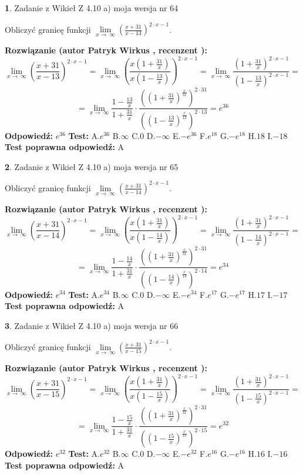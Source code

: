 \documentclass[12pt, a4paper]{article}
\theoremstyle{definition} %
\newtheorem{zad}{}
\newcommand{\zadStart}[1]{\begin{zad}#1\newline}
\newcommand{\zadStop}{\end{zad}}
\newcommand{\rozwStart}[2]{\noindent \textbf{Rozwiązanie (autor #1 , recenzent #2): }\newline}
\newcommand{\rozwStop}{\newline}
\newcommand{\odpStart}{\noindent \textbf{Odpowiedź:}\newline}
\newcommand{\odpStop}{\newline}
\newcommand{\testStart}{\noindent \textbf{Test:}\newline}
\newcommand{\testStop}{\newline}
\newcommand{\kluczStart}{\noindent \textbf{Test poprawna odpowiedź:}\newline}
\newcommand{\kluczStop}{\newline}
\begin{document}
\zadStart{Zadanie z Wikieł Z 4.10 a) moja wersja nr 64}

Obliczyć granicę funkcji  $\lim\limits_{x\to\ \infty}(\frac{x+31}{x-13})^{2\cdot x-1}$.
\zadStop
\rozwStart{Patryk Wirkus}{}
$$\lim\limits_{x\to\ \infty}(\frac{x+31}{x-13})^{2\cdot x-1} = \lim\limits_{x\to\ \infty}(\frac{x(1+\frac{31}{x})}{x(1-\frac{13}{x})})^{2\cdot x-1}=\lim\limits_{x\to\ \infty}\frac{(1+\frac{31}{x})^{2\cdot x-1}}{(1-\frac{13}{x})^{2\cdot x-1}}=$$
$$=\lim\limits_{x\to\ \infty}\frac{1-\frac{13}{x}}{1+\frac{31}{x}}\cdot\frac{((1+\frac{31}{x})^{\frac{x}{31}})^{2\cdot31}}{((1-\frac{13}{x})^{\frac{x}{13}})^{2\cdot13}}=e^{36}$$
\rozwStop
\odpStart
$e^{36}$
\odpStop
\testStart
A.$e^{36}$ B.$\infty$ C.$0$ D.$-\infty$ E.$-e^{36}$
F.$e^{18}$ G.$-e^{18}$
H.$18$
I.$-18$
\testStop
\kluczStart
A
\kluczStop



\zadStart{Zadanie z Wikieł Z 4.10 a) moja wersja nr 65}

Obliczyć granicę funkcji  $\lim\limits_{x\to\ \infty}(\frac{x+31}{x-14})^{2\cdot x-1}$.
\zadStop
\rozwStart{Patryk Wirkus}{}
$$\lim\limits_{x\to\ \infty}(\frac{x+31}{x-14})^{2\cdot x-1} = \lim\limits_{x\to\ \infty}(\frac{x(1+\frac{31}{x})}{x(1-\frac{14}{x})})^{2\cdot x-1}=\lim\limits_{x\to\ \infty}\frac{(1+\frac{31}{x})^{2\cdot x-1}}{(1-\frac{14}{x})^{2\cdot x-1}}=$$
$$=\lim\limits_{x\to\ \infty}\frac{1-\frac{14}{x}}{1+\frac{31}{x}}\cdot\frac{((1+\frac{31}{x})^{\frac{x}{31}})^{2\cdot31}}{((1-\frac{14}{x})^{\frac{x}{14}})^{2\cdot14}}=e^{34}$$
\rozwStop
\odpStart
$e^{34}$
\odpStop
\testStart
A.$e^{34}$ B.$\infty$ C.$0$ D.$-\infty$ E.$-e^{34}$
F.$e^{17}$ G.$-e^{17}$
H.$17$
I.$-17$
\testStop
\kluczStart
A
\kluczStop



\zadStart{Zadanie z Wikieł Z 4.10 a) moja wersja nr 66}

Obliczyć granicę funkcji  $\lim\limits_{x\to\ \infty}(\frac{x+31}{x-15})^{2\cdot x-1}$.
\zadStop
\rozwStart{Patryk Wirkus}{}
$$\lim\limits_{x\to\ \infty}(\frac{x+31}{x-15})^{2\cdot x-1} = \lim\limits_{x\to\ \infty}(\frac{x(1+\frac{31}{x})}{x(1-\frac{15}{x})})^{2\cdot x-1}=\lim\limits_{x\to\ \infty}\frac{(1+\frac{31}{x})^{2\cdot x-1}}{(1-\frac{15}{x})^{2\cdot x-1}}=$$
$$=\lim\limits_{x\to\ \infty}\frac{1-\frac{15}{x}}{1+\frac{31}{x}}\cdot\frac{((1+\frac{31}{x})^{\frac{x}{31}})^{2\cdot31}}{((1-\frac{15}{x})^{\frac{x}{15}})^{2\cdot15}}=e^{32}$$
\rozwStop
\odpStart
$e^{32}$
\odpStop
\testStart
A.$e^{32}$ B.$\infty$ C.$0$ D.$-\infty$ E.$-e^{32}$
F.$e^{16}$ G.$-e^{16}$
H.$16$
I.$-16$
\testStop
\kluczStart
A
\kluczStop
\end{document}
